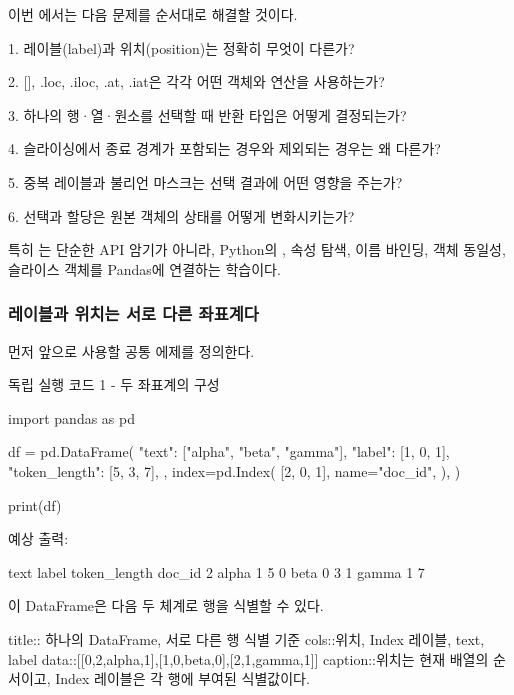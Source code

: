 이번 에서는 다음 문제를 순서대로 해결할 것이다.

\begin{dhksmry}
1. 레이블(label)과 위치(position)는 정확히 무엇이 다른가?

2. [], .loc, .iloc, .at, .iat은 각각 어떤 객체와 연산을 사용하는가?

3. 하나의 행·열·원소를 선택할 때 반환 타입은 어떻게 결정되는가?

4. 슬라이싱에서 종료 경계가 포함되는 경우와 제외되는 경우는 왜 다른가?

5. 중복 레이블과 불리언 마스크는 선택 결과에 어떤 영향을 주는가?

6. 선택과 할당은 원본 객체의 상태를 어떻게 변화시키는가?
\end{dhksmry}

특히 는 단순한 API 암기가 아니라, Python의 , 속성 탐색, 이름 바인딩, 객체 동일성, 슬라이스 객체를 Pandas에 연결하는 학습이다.

\subsubsection{레이블과 위치는 서로 다른 좌표계다}

먼저 앞으로 사용할 공통 에제를 정의한다.

\begin{dhknote}
\begin{dhksmry}[centered]
독립 실행 코드 1 - 두 좌표계의 구성
\end{dhksmry}
\end{dhknote}

\begin{dhkcode}
import pandas as pd

df = pd.DataFrame(
    {
        "text": ["alpha", "beta", "gamma"],
        "label": [1, 0, 1],
        "token_length": [5, 3, 7],
    },
    index=pd.Index(
        [2, 0, 1],
        name="doc_id",
    ),
)

print(df)
\end{dhkcode}

예상 출력:

\begin{dhkzsh}
         text  label  token_length
doc_id
2       alpha      1             5
0        beta      0             3
1       gamma      1             7
\end{dhkzsh}

이 DataFrame은 다음 두 체계로 행을 식별할 수 있다.

\begin{dhkmatrix}[delim=none,style=cards]
title:: 하나의 DataFrame, 서로 다른 행 식별 기준
cols::위치, Index 레이블, text, label
data::[[0,2,alpha,1],[1,0,beta,0],[2,1,gamma,1]]
caption::위치는 현재 배열의 순서이고, Index 레이블은 각 행에 부여된 식별값이다.
\end{dhkmatrix}

